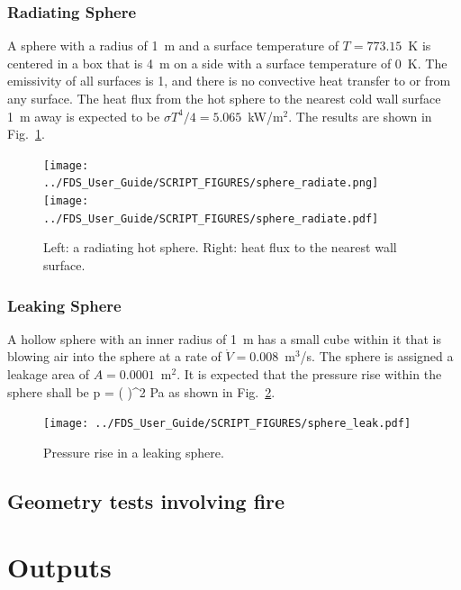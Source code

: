 \documentclass[11pt]{book}
\begin{document}
\subsection{Radiating Sphere}
\label{sphere_radiate}

A sphere with a radius of 1~m and a surface temperature of $T=773.15$~K is centered in a box that is 4~m on a side with a surface temperature of 0~K. The emissivity of all surfaces is 1, and there is no convective heat transfer to or from any surface. The heat flux from the hot sphere to the nearest cold wall surface 1~m away is expected to be $\sigma T^4/4=5.065$~kW/m$^2$. The results are shown in Fig.~\ref{sphere_radiate_fig}.
\begin{figure}[ht]
\texttt{[image: ../FDS\_User\_Guide/SCRIPT\_FIGURES/sphere\_radiate.png]}
\texttt{[image: ../FDS\_User\_Guide/SCRIPT\_FIGURES/sphere\_radiate.pdf]}
\caption[The {\ct sphere\_radiate} test case]{Left: a radiating hot sphere. Right: heat flux to the nearest wall surface.}
\label{sphere_radiate_fig}
\end{figure}


\subsection{Leaking Sphere}
\label{sphere_leak}

A hollow sphere with an inner radius of 1~m has a small cube within it that is blowing air into the sphere at a rate of $\dot{V}=0.008$~m$^3$/s. The sphere is assigned a leakage area of $A=0.0001$~m$^2$. It is expected that the pressure rise within the sphere shall be
\be
   \Delta p =  \left(  \right)^2  \; \hbox{Pa}
\ee
as shown in Fig.~\ref{sphere_leak_fig}.
\begin{figure}[ht]
\centering
\texttt{[image: ../FDS\_User\_Guide/SCRIPT\_FIGURES/sphere\_leak.pdf]}
\caption[The {\ct sphere\_leak} test case]{Pressure rise in a leaking sphere.}
\label{sphere_leak_fig}
\end{figure}


\section{Geometry tests involving fire}



\fi





\chapter{Outputs}
\end{document}
